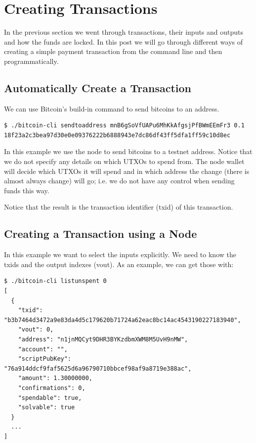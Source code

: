 \section{Creating Transactions}

In the previous section we went through transactions, their inputs and outputs and how the funds are locked. In this post we will go through different ways of creating a simple payment transaction from the command line and then programmatically. 

\subsection*{Automatically Create a Transaction}

We can use Bitcoin's build-in command  to send bitcoins to an address.

\begin{emphbox}
\begin{lstlisting}[style=Bash]
$ ./bitcoin-cli sendtoaddress mnB6gSoVfUAPu6MhKkAfgsjPfBWmEEmFr3 0.1
18f23a2c3bea97d30e0e09376222b6888943e7dc86df43ff5dfa1ff59c10d8ec
\end{lstlisting}
\end{emphbox}

In this example we use the node to send  bitcoins to a testnet address. Notice that we do not specify any details on which UTXOs to spend from. The node wallet will decide which UTXOs it will spend and in which address the change (there is almost always change) will go; i.e. we do not have any control when sending funds this way.

\begin{note}
Notice that the result is the transaction identifier (txid) of this transaction.
\end{note}


\subsection*{Creating a Transaction using a Node}

In this example we want to select the inputs explicitly. We need to know the txids and the output indexes (vout). As an example, we can get those with:

\begin{emphbox}
\begin{lstlisting}[style=Bash]
$ ./bitcoin-cli listunspent 0
[
  {
    "txid": "b3b7464d3472a9e83da4d5c179620b71724a62eac8bc14ac4543190227183940",
    "vout": 0,
    "address": "n1jnMQCyt9DHR3BYKzdbmXWM8M5UvH9nMW",
    "account": "",
    "scriptPubKey": "76a914ddcf9faf5625d6a96790710bbcef98af9a8719e388ac",
    "amount": 1.30000000,
    "confirmations": 0,
    "spendable": true,
    "solvable": true
  }
  ...
]
\end{lstlisting}
\end{emphbox}

